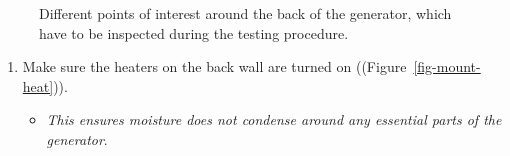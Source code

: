 \documentclass[
  letterpaper,
  DIV=11,
  numbers=noendperiod]{scrreprt}
\providecommand{\tightlist}{%
  \setlength{\itemsep}{0pt}\setlength{\parskip}{0pt}}\usepackage{longtable,booktabs,array}
\begin{document}
\begin{figure}[H]

\begin{minipage}[t]{0.33\linewidth}

{\centering 


}

\end{minipage}%
%
\begin{minipage}[t]{0.33\linewidth}

{\centering 


}

\end{minipage}%
%
\begin{minipage}[t]{0.33\linewidth}

{\centering 


}

\end{minipage}%

\caption{\label{fig-generator}Different points of interest around the
back of the generator, which have to be inspected during the testing
procedure.}

\end{figure}

\begin{enumerate}
\def\labelenumi{\arabic{enumi}.}
\setcounter{enumi}{4}
\tightlist
\item
  Make sure the heaters on the back wall are turned on
  ((Figure~\ref{fig-mount-heat})).

  \begin{itemize}
  \tightlist
  \item
    \emph{This ensures moisture does not condense around any essential
    parts of the generator}.
  \end{itemize}
\end{enumerate}
\end{document}
